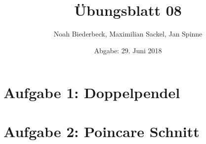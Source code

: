 \documentclass{scrartcl}
\title{Übungsblatt 08}
\author{%
  Noah Biederbeck, Maximilian Sackel, Jan Spinne
}
\date{Abgabe: 29. Juni 2018}
\begin{document}
\maketitle
\section*{Aufgabe 1: Doppelpendel}
\section*{Aufgabe 2: Poincare Schnitt}
\end{document}
